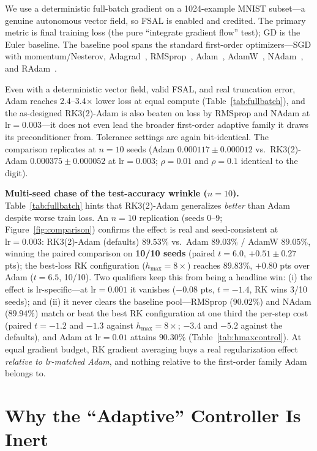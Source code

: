 \documentclass{article}
\newcommand{\hmax}{h_{\max}}
\begin{document}
We use a deterministic full-batch gradient on a 1024-example MNIST subset---a genuine autonomous vector field, so FSAL is enabled and credited. The primary metric is final training loss (the pure ``integrate gradient flow'' test); GD is the Euler baseline. The baseline pool spans the standard first-order optimizers---SGD with momentum/Nesterov, Adagrad~\cite{duchi2011adaptive}, RMSprop~\cite{tieleman2012rmsprop}, Adam~\cite{kingma2015adam}, AdamW~\cite{loshchilov2019decoupled}, NAdam~\cite{dozat2016incorporating}, and RAdam~\cite{liu2020variance}.

Even with a deterministic vector field, valid FSAL, and real truncation error, Adam reaches 2.4--3.4$\times$ lower loss at equal compute (Table~\ref{tab:fullbatch}), and the as-designed RK3(2)-Adam is also beaten on loss by RMSprop and NAdam at $\mathrm{lr}{=}0.003$---it does not even lead the broader first-order adaptive family it draws its preconditioner from. Tolerance settings are again bit-identical. The comparison replicates at $n{=}10$ seeds (Adam $0.000117 \pm 0.000012$ vs.\ RK3(2)-Adam $0.000375 \pm 0.000052$ at $\mathrm{lr}{=}0.003$; $\rho{=}0.01$ and $\rho{=}0.1$ identical to the digit).

\textbf{Multi-seed chase of the test-accuracy wrinkle ($n{=}10$).} Table~\ref{tab:fullbatch} hints that RK3(2)-Adam generalizes \emph{better} than Adam despite worse train loss. An $n{=}10$ replication (seeds 0--9; Figure~\ref{fig:comparison}) confirms the effect is real and seed-consistent at $\mathrm{lr}{=}0.003$: RK3(2)-Adam (defaults) $89.53\%$ vs.\ Adam $89.03\%$ / AdamW $89.05\%$, winning the paired comparison on \textbf{10/10 seeds} (paired $t = 6.0$, $+0.51 \pm 0.27$ pts); the best-loss RK configuration ($\hmax{=}8\times$) reaches $89.83\%$, $+0.80$ pts over Adam ($t = 6.5$, 10/10). Two qualifiers keep this from being a headline win: (i) the effect is lr-specific---at $\mathrm{lr}{=}0.001$ it vanishes ($-0.08$ pts, $t = -1.4$, RK wins 3/10 seeds); and (ii) it never clears the baseline pool---RMSprop ($90.02\%$) and NAdam ($89.94\%$) match or beat the best RK configuration at one third the per-step cost (paired $t = -1.2$ and $-1.3$ against $\hmax{=}8\times$; $-3.4$ and $-5.2$ against the defaults), and Adam at $\mathrm{lr}{=}0.01$ attains $90.30\%$ (Table~\ref{tab:hmaxcontrol}). At equal gradient budget, RK gradient averaging buys a real regularization effect \emph{relative to lr-matched Adam}, and nothing relative to the first-order family Adam belongs to.

\section{Why the ``Adaptive'' Controller Is Inert}
\label{sec:diagnosis}
\end{document}
